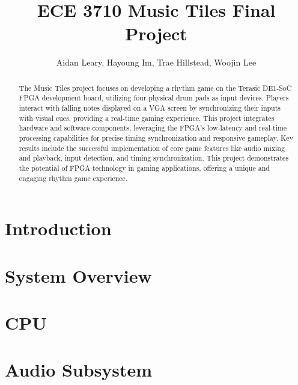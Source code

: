 \documentclass[10pt, letterpaper]{IEEEtran}
\begin{document}
\title{ECE 3710 Music Tiles Final Project\\
}

  \author{
  {Aidan Leary, Hayoung Im, Trae Hillstead, Woojin Lee}
  }


  \maketitle

  \begin{abstract}
The Music Tiles project focuses on developing a rhythm game on the Terasic DE1-SoC FPGA 
development board, 
utilizing four physical drum pads as input devices. Players interact with falling notes 
displayed on a VGA screen by synchronizing their inputs with visual cues, providing a 
real-time gaming experience. This project integrates hardware and software components, 
leveraging the FPGA's low-latency and real-time processing capabilities for precise 
timing synchronization and responsive gameplay. Key results include the successful 
implementation of core game features like audio mixing and playback, input detection, and 
timing synchronization.
This project demonstrates the potential of FPGA technology in gaming applications, 
offering a unique and engaging rhythm game experience.
  \end{abstract}


  \section{Introduction} 
  

  \section{System Overview}
  

  \section{CPU}
  

  \section{Audio Subsystem}
  
\end{document}
